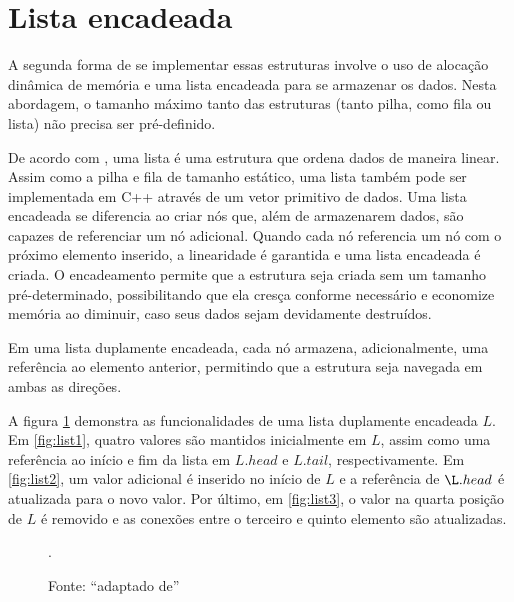 \section{Lista encadeada}

A segunda forma de se implementar essas estruturas involve o uso de alocação dinâmica de memória e uma lista encadeada para se armazenar os dados. Nesta abordagem, o tamanho máximo tanto das estruturas (tanto pilha, como fila ou lista) não precisa ser pré-definido.

De acordo com \cite{cormen_introduction_2009}, uma lista é uma estrutura que ordena dados de maneira linear. Assim como a pilha e fila de tamanho estático, uma lista também pode ser implementada em C++ através de um vetor primitivo de dados. Uma lista encadeada se diferencia ao criar nós que, além de armazenarem dados, são capazes de referenciar um nó adicional. Quando cada nó referencia um nó com o próximo elemento inserido, a linearidade é garantida e uma lista encadeada é criada. O encadeamento permite que a estrutura seja criada sem um tamanho pré-determinado, possibilitando que ela cresça conforme necessário e economize memória ao diminuir, caso seus dados sejam devidamente destruídos.

Em uma lista duplamente encadeada, cada nó armazena, adicionalmente, uma referência ao elemento anterior, permitindo que a estrutura seja navegada em ambas as direções.

A figura \ref{fig:list} demonstra as funcionalidades de uma lista duplamente encadeada \(L\). Em \ref{fig:list1}, quatro valores são mantidos inicialmente em \(L\), assim como uma referência ao início e fim da lista em \(L.head\) e \(L.tail\), respectivamente. Em \ref{fig:list2}, um valor adicional é inserido no início de \(L\) e a referência de \(\L.head\) é atualizada para o novo valor. Por último, em \ref{fig:list3}, o valor na quarta posição de \(L\) é removido e as conexões entre o terceiro e quinto elemento são atualizadas.

\begin{figure}[h!]
  \centering


  \caption{Fonte: ``adaptado de'' \cite{cormen_introduction_2009}}.\label{fig:list}
\end{figure}

